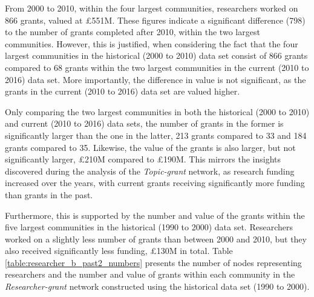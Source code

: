 From 2000 to 2010, within the four largest communities, researchers worked on 866 grants, valued at \pounds551M. These figures indicate a significant difference (798) to the number of grants completed after 2010, within the two largest communities. However, this is justified, when considering the fact that the four largest communities in the historical (2000 to 2010) data set consist of 866 grants compared to 68 grants within the two largest communities in the current (2010 to 2016) data set. More importantly, the difference in value is not significant, as the grants in the current (2010 to 2016) data set are valued higher.

Only comparing the two largest communities in both the historical (2000 to 2010) and current (2010 to 2016) data sets, the number of grants in the former is significantly larger than the one in the latter, 213 grants compared to 33 and 184 grants compared to 35. Likewise, the value of the grants is also larger, but not significantly larger, \pounds210M compared to \pounds190M. This mirrors the insights discovered during the analysis of the \textit{Topic-grant} network, as research funding increased over the years, with current grants receiving significantly more funding than grants in the past.

Furthermore, this is supported by the number and value of the grants within the five largest communities in the historical (1990 to 2000) data set. Researchers worked on a slightly less number of grants than between 2000 and 2010, but they also received significantly less funding, \pounds130M in total. Table \ref{table:researcher_b_past2_numbers} presents the number of nodes representing researchers and the number and value of grants within each community in the \textit{Researcher-grant} network constructed using the historical data set (1990 to 2000).

